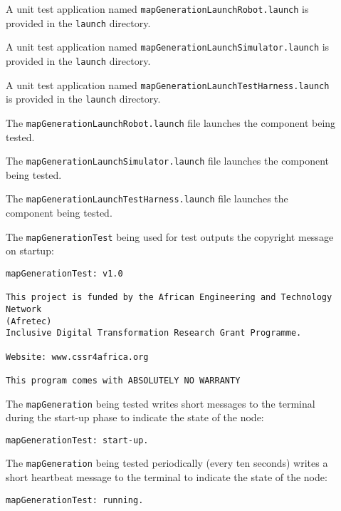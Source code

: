 \documentclass{CSSRforAfrica}
\newcommand{\checkboxChecked}{\fbox{\ding{51}}} %
\newcommand{\checkboxDashed}{\fbox{--}}         %
\begin{document}
\begin{description}
\item[\checkboxDashed] A unit test application named {\small \verb+mapGenerationLaunchRobot.launch+} is provided in the {\small \verb+launch+} directory. 

\item[\checkboxDashed] A unit test application named {\small \verb+mapGenerationLaunchSimulator.launch+} is provided in the {\small \verb+launch+} directory. 

\item[\checkboxChecked] A unit test application named {\small \verb+mapGenerationLaunchTestHarness.launch+} is provided in the {\small \verb+launch+} directory. 

\item[\checkboxDashed] The {\small \verb+mapGenerationLaunchRobot.launch+} file  launches the component being tested.

\item[\checkboxDashed] The {\small \verb+mapGenerationLaunchSimulator.launch+} file  launches the component being tested.

\item[\checkboxChecked] The {\small \verb+mapGenerationLaunchTestHarness.launch+} file  launches the component being tested.

\item[\checkboxChecked]  The {\small \verb+mapGenerationTest+} being used for test outputs the copyright message on startup: 
\begin{verbatim}
mapGenerationTest: v1.0
 
This project is funded by the African Engineering and Technology Network 
(Afretec) 
Inclusive Digital Transformation Research Grant Programme.
 
Website: www.cssr4africa.org
 
This program comes with ABSOLUTELY NO WARRANTY
\end{verbatim}

\item[\checkboxChecked]  The {\small \verb+mapGeneration+} being tested writes short messages to the terminal during the start-up phase to
 indicate the state of the node:
\begin{verbatim}
mapGenerationTest: start-up.
\end{verbatim}

\item[\checkboxChecked]  The {\small \verb+mapGeneration+} being tested periodically (every ten seconds) writes a short heartbeat message to
 the terminal to indicate the state of the node:
\begin{verbatim}
mapGenerationTest: running.
\end{verbatim}


\end{description}
\end{document}
